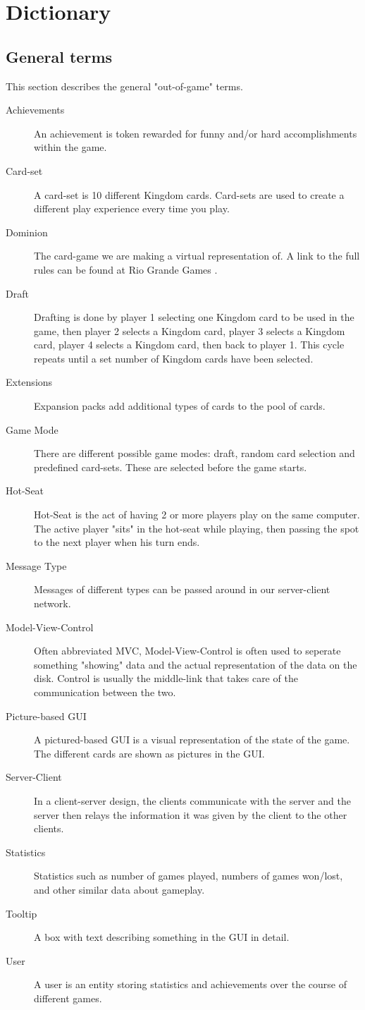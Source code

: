 \section{Dictionary}
\subsection{General terms}
This section describes the general "out-of-game" terms.
\begin{description}
\item[Achievements] An achievement is token rewarded for funny and/or hard accomplishments within the game.
\item[Card-set] A card-set is 10 different Kingdom cards. Card-sets are used to create a different play experience every time you play.
\item[Dominion] The card-game we are making a virtual representation of. A link to the full rules can be found at Rio Grande Games \cite{dominionRules}.
\item[Draft] Drafting is done by player 1 selecting one Kingdom card to be used in the game, then player 2 selects a Kingdom card, player 3 selects a Kingdom card, player 4 selects a Kingdom card, then back to player 1. This cycle repeats until a set number of Kingdom cards have been selected.
\item[Extensions] Expansion packs add additional types of cards to the pool of cards.
\item[Game Mode] There are different possible game modes: draft, random card selection and predefined card-sets. These are selected before the game starts.
\item[Hot-Seat] Hot-Seat is the act of having 2 or more players play on the same computer. The active player "sits" in the hot-seat while playing, then passing the spot to the next player when his turn ends.
\item[Message Type] Messages of different types can be passed around in our server-client network.
\item[Model-View-Control] Often abbreviated MVC, Model-View-Control is often used to seperate something "showing" data and the actual representation of the data on the disk. Control is usually the middle-link that takes care of the communication between the two.
\item[Picture-based GUI] A pictured-based GUI is a visual representation of the state of the game. The different cards are shown as pictures in the GUI.
\item[Server-Client] In a client-server design, the clients communicate with the server and the server then relays the information it was given by the client to the other clients.
\item[Statistics] Statistics such as number of games played, numbers of games won/lost, and other similar data about gameplay.
\item[Tooltip] A box with text describing something in the GUI in detail.
\item[User] A user is an entity storing statistics and achievements over the course of different games.
\end{description}
